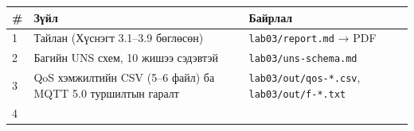 \begingroup\scriptsize\begin{longtable}[]{@{}lll@{}}
\toprule
\begin{minipage}[b]{0.30\columnwidth}\raggedright
\#\strut
\end{minipage} & \begin{minipage}[b]{0.30\columnwidth}\raggedright
Зүйл\strut
\end{minipage} & \begin{minipage}[b]{0.30\columnwidth}\raggedright
Байрлал\strut
\end{minipage}\tabularnewline
\midrule
\endhead
\begin{minipage}[t]{0.30\columnwidth}\raggedright
1\strut
\end{minipage} & \begin{minipage}[t]{0.30\columnwidth}\raggedright
Тайлан (Хүснэгт 3.1--3.9 бөглөсөн)\strut
\end{minipage} & \begin{minipage}[t]{0.30\columnwidth}\raggedright
\texttt{lab03/report.md} → PDF\strut
\end{minipage}\tabularnewline
\begin{minipage}[t]{0.30\columnwidth}\raggedright
2\strut
\end{minipage} & \begin{minipage}[t]{0.30\columnwidth}\raggedright
Багийн UNS схем, 10 жишээ сэдэвтэй\strut
\end{minipage} & \begin{minipage}[t]{0.30\columnwidth}\raggedright
\texttt{lab03/\allowbreak{}uns-schema.\allowbreak{}md}\strut
\end{minipage}\tabularnewline
\begin{minipage}[t]{0.30\columnwidth}\raggedright
3\strut
\end{minipage} & \begin{minipage}[t]{0.30\columnwidth}\raggedright
QoS хэмжилтийн CSV (5--6 файл) ба MQTT 5.0 туршилтын гаралт\strut
\end{minipage} & \begin{minipage}[t]{0.30\columnwidth}\raggedright
\texttt{lab03/\allowbreak{}out/\allowbreak{}qos-*.\allowbreak{}csv}, \texttt{lab03/\allowbreak{}out/\allowbreak{}f-*.\allowbreak{}txt}\strut
\end{minipage}\tabularnewline
\begin{minipage}[t]{0.30\columnwidth}\raggedright
4\strut
\end{minipage} & \begin{minipage}[t]{0.30\columnwidth}\raggedright

\end{minipage}
\end{longtable}
